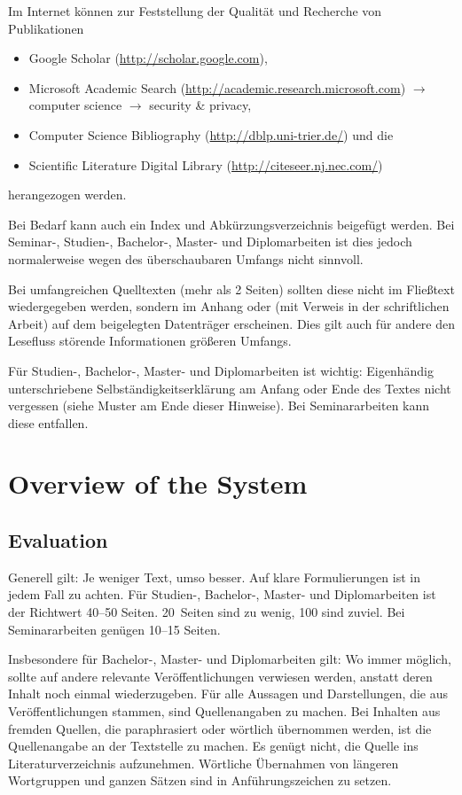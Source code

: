 \documentclass[
    fontsize=12pt,
    headings=small,
    parskip=half,           %
    bibliography=totoc,
    numbers=noenddot,       %
    open=any,               %
    ]{scrreprt}
\begin{document}
Im Internet können zur Feststellung der Qualität und Recherche von Publikationen

\begin{itemize}
	\item Google Scholar (\url{http://scholar.google.com}),
	\item Microsoft Academic Search (\href{http://academic.research.microsoft.com/?SearchDomain=2&SubDomain=2&entitytype=2}{http://academic.research.microsoft.com}) $\to$ computer science $\to$ security \& privacy,
	\item Computer Science Bibliography (\url{http://dblp.uni-trier.de/}) und die
	\item Scientific Literature Digital Library (\url{http://citeseer.nj.nec.com/})
\end{itemize}

herangezogen werden.

Bei Bedarf kann auch ein Index und Abkürzungsverzeichnis beigefügt werden. Bei Seminar-, Studien-, Bachelor-, Master- und Diplomarbeiten ist dies jedoch normalerweise wegen des überschaubaren Umfangs nicht sinnvoll.

Bei umfangreichen Quelltexten (mehr als 2 Seiten) sollten diese nicht im Fließtext wiedergegeben werden, sondern im Anhang oder (mit Verweis in der schriftlichen Arbeit) auf dem beigelegten Datenträger erscheinen. Dies gilt auch für andere den Lesefluss störende Informationen größeren Umfangs.

Für Studien-, Bachelor-, Master- und Diplomarbeiten ist wichtig: Eigenhändig unterschriebene Selbständigkeitserklärung am Anfang oder Ende des Textes nicht vergessen (siehe Muster am Ende dieser Hinweise). Bei Seminararbeiten kann diese entfallen.

\chapter{Overview of the System}

\section{Evaluation}

Generell gilt: Je weniger Text, umso besser. Auf klare Formulierungen ist in jedem Fall zu achten. Für Studien-, Bachelor-, Master- und Diplomarbeiten ist der Richtwert 40--50 Seiten. 20~Seiten sind zu wenig, 100 sind zuviel. Bei Seminararbeiten genügen 10--15 Seiten.

Insbesondere für Bachelor-, Master- und Diplomarbeiten gilt: Wo immer möglich, sollte auf andere relevante Veröffentlichungen verwiesen werden, anstatt deren Inhalt noch einmal wiederzugeben. Für alle Aussagen und Darstellungen, die aus Veröffentlichungen stammen, sind Quellenangaben zu machen. Bei Inhalten aus fremden Quellen, die paraphrasiert oder wörtlich übernommen werden, ist die Quellenangabe an der Textstelle zu machen. Es genügt nicht, die Quelle ins Literaturverzeichnis aufzunehmen. Wörtliche Übernahmen von längeren Wortgruppen und ganzen Sätzen sind in Anführungszeichen zu setzen.
\end{document}
